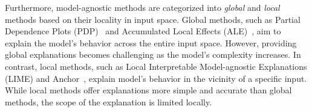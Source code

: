 \documentclass[11pt]{article}
\begin{document}
Furthermore, model-agnostic methods are categorized into
\emph{global} and \emph{local} methods based on their locality in input space.
Global methods,
such as Partial Dependence Plots (PDP)~\cite{friedman2001greedy}
and Accumulated Local Effects (ALE)~\cite{apley2020visualizing},
aim to explain the model's behavior across the entire input space.
However, providing global explanations becomes challenging
as the model's complexity increases.
In contrast, local methods,
such as Local Interpretable Model-agnostic Explanations (LIME)
\cite{ribeiro2016why}
and Anchor~\cite{ribeiro2018anchors},
explain model's behavior in the vicinity of a specific input.
While local methods offer explanations more simple and accurate
than global methods,
the scope of the explanation is limited locally.
\end{document}
